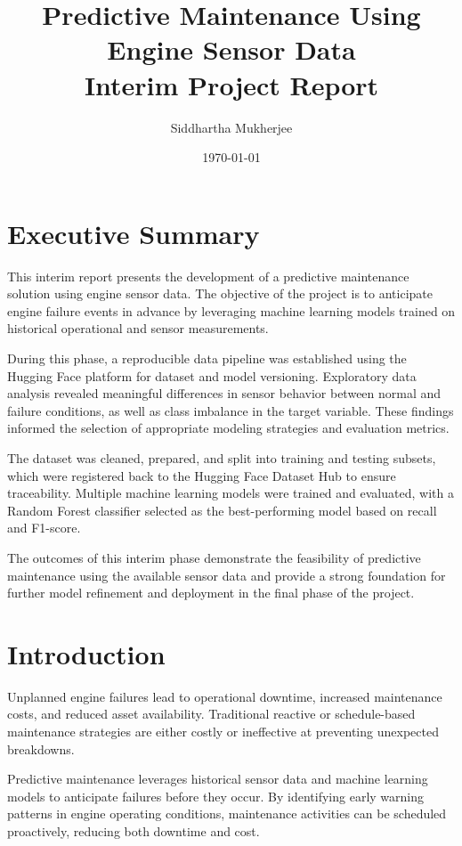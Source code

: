 \documentclass[11pt,a4paper]{article}
\title{Predictive Maintenance Using Engine Sensor Data\\
\large Interim Project Report}
\author{Siddhartha Mukherjee}
\date{\today}
\begin{document}
\maketitle
\thispagestyle{empty}

\section*{Executive Summary}

This interim report presents the development of a predictive maintenance solution using engine sensor data. The objective of the project is to anticipate engine failure events in advance by leveraging machine learning models trained on historical operational and sensor measurements.

During this phase, a reproducible data pipeline was established using the Hugging Face platform for dataset and model versioning. Exploratory data analysis revealed meaningful differences in sensor behavior between normal and failure conditions, as well as class imbalance in the target variable. These findings informed the selection of appropriate modeling strategies and evaluation metrics.

The dataset was cleaned, prepared, and split into training and testing subsets, which were registered back to the Hugging Face Dataset Hub to ensure traceability. Multiple machine learning models were trained and evaluated, with a Random Forest classifier selected as the best-performing model based on recall and F1-score.

The outcomes of this interim phase demonstrate the feasibility of predictive maintenance using the available sensor data and provide a strong foundation for further model refinement and deployment in the final phase of the project.

\newpage


\section{Introduction}

Unplanned engine failures lead to operational downtime, increased maintenance costs, and reduced asset availability. Traditional reactive or schedule-based maintenance strategies are either costly or ineffective at preventing unexpected breakdowns.

Predictive maintenance leverages historical sensor data and machine learning models to anticipate failures before they occur. By identifying early warning patterns in engine operating conditions, maintenance activities can be scheduled proactively, reducing both downtime and cost.
\end{document}
